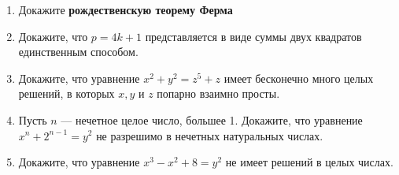 \documentclass{article}
\begin{document}
\begin{enumerate}[label*=\protect\fbox{\arabic{enumi}}]
	\item Докажите \textbf{рождественскую теорему Ферма}
	
	\item  Докажите, что $p = 4k + 1$ представляется в виде суммы двух квадратов единственным
	способом.
	
	\item Докажите, что уравнение $x^2 + y^2 = z^5 + z$ имеет бесконечно много целых решений, в
	которых $x, y$ и $z$ попарно взаимно просты.
	\item Пусть $n$ — нечетное целое число, большее 1. Докажите, что уравнение $x^n + 2^{n-1} = y^2$
	не разрешимо в нечетных натуральных числах.
	\item Докажите, что уравнение $x^3 - x^2 + 8 = y^2$ не имеет решений в целых числах.

\end{enumerate}
\end{document}
